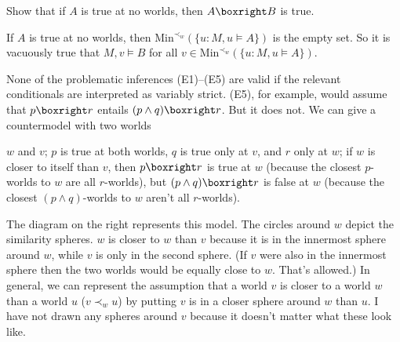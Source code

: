 \begin{exercise}
  Show that if $A$ is true at no worlds, then $A \boxright B$ is true.
\end{exercise}
\begin{solution}
  If $A$ is true at no worlds, then $\mathrm{Min}^{\prec_w}(\{u: M,u\models A\})$
  is the empty set. So it is vacuously true that $M,v \models B$ for all
  $v \in \mathrm{Min}^{\prec_w}(\{ u: M,u \models A \})$.
\end{solution}

None of the problematic inferences (E1)--(E5) are valid if the relevant
conditionals are interpreted as variably strict. (E5), for example, would assume
that $p \boxright r $ entails $(p \land q) \boxright r$. But it does not.
We can
give a countermodel with two worlds
\begin{wrapfigure}{r}{5cm}
  \vspace{-5mm}
  \quad
  \vspace{-10mm}
\end{wrapfigure}
$w$ and $v$; $p$ is true at both worlds, $q$
is true only at $v$, and $r$ only at $w$; if $w$ is closer
to itself than $v$,
then $p \boxright r$ is true at $w$ (because the closest $p$-worlds to $w$ are
all $r$-worlds), but $(p \land q) \boxright r$ is false at $w$ (because the
closest $(p\land q)$-worlds to $w$ aren't all $r$-worlds).

The diagram on the right represents this model. The circles around $w$ depict
the similarity spheres. $w$ is closer to $w$ than $v$ because it is in the
innermost sphere around $w$, while $v$ is only in the second sphere. (If $v$
were also in the innermost sphere then the two worlds would be equally close to
$w$. That's allowed.) In general, we can represent the assumption that a world $v$
is closer to a world $w$ than a world $u$ ($v \prec_w u$) by putting $v$ is in a
closer sphere around $w$ than $u$. I have not drawn any spheres around $v$
because it doesn't matter what these look like.

